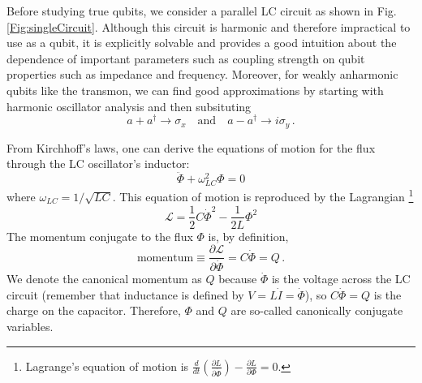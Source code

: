
Before studying true qubits, we consider a parallel LC circuit as shown in Fig.\,\ref{Fig:singleCircuit}.
Although this circuit is harmonic and therefore impractical to use as a qubit, it is explicitly solvable and provides a good intuition about the dependence of important parameters such as coupling strength on qubit properties such as impedance and frequency.
Moreover, for weakly anharmonic qubits like the transmon, we can find good approximations by starting with harmonic oscillator analysis and then subsituting
\begin{equation}
a+a^\dagger \rightarrow \sigma_x \quad \textrm{and} \quad a-a^\dagger \rightarrow i \sigma_y \, .
\end{equation}

From Kirchhoff's laws, one can derive the equations of motion for the flux through the LC oscillator's inductor:
\begin{equation}
\ddot{\Phi} + \omega_{LC}^2 \Phi = 0 \end{equation}
where $\omega_{LC}=1/\sqrt{LC}$.
This equation of motion is reproduced by the Lagrangian \footnote{Lagrange's equation of motion is $\frac{d}{dt}\left( \frac{\partial L}{\partial \dot{\Phi}} \right) - \frac{\partial L}{\partial \Phi} = 0$.}
\begin{equation}
\mathcal{L} = \frac{1}{2}C\dot{\Phi}^2 - \frac{1}{2L}\Phi^2
\end{equation}
The momentum conjugate to the flux $\Phi$ is, by definition,
\begin{equation}
  \text{momentum} \equiv \frac{\partial \mathcal{L}}{\partial \dot{\Phi}} = C\dot{\Phi} = Q \, .
\end{equation}
We denote the canonical momentum as $Q$ because $\dot{\Phi}$ is the voltage across the LC circuit (remember that inductance is defined by $V = L \dot{I} = \dot{\Phi}$), so $C \dot{\Phi} = Q$ is the charge on the capacitor.
Therefore, $\Phi$ and $Q$ are so-called canonically conjugate variables.

